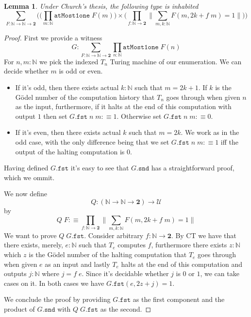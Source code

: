 \documentclass[12pt]{report}
\newtheorem{lem}[thm]{Lemma}
\begin{document}
\begin{lem}\label{405}
Under Church's thesis, the following type is inhabited
$$\sum_{F : \mathbb{N} \rightarrow \mathbb{N} \rightarrow \mathbf{2}} \Big( \big(\prod_{m : \mathbb{N}} \mathtt{atMost1one}\; F(m) \big) \times \big( \prod_{f : \mathbb{N} \rightarrow \mathbf{2}} \big\lVert \sum_{m, k : \mathbb{N}} F(m, 2k+ f\; m) = 1 \big\rVert \big) \Big)$$
\end{lem}
\begin{proof}
First we provide a witness
$$G : \sum_{F : \mathbb{N} \rightarrow \mathbb{N} \rightarrow \mathbf{2} } \prod_{n : \mathbb{N}}\mathtt{atMost1one}\; F(n)$$
For $n, m : \mathbb{N}$ we pick the indexed $T_n$ Turing machine of our enumeration. 
We can decide whether $m$ is odd or even. 
\begin{itemize}
\item If it's odd, then there exists actual $k : \mathbb{N}$ such that $m = 2k +1$. 
If $k$ is the Gödel number of the computation history that $T_n$ goes through when given $n$ as the input, furthermore, if it halts at the end of this computation with output $1$ then set $G.\mathtt{fst}\; n\; m :\equiv 1$. 
Otherwise set $G.\mathtt{fst}\; n\; m :\equiv 0$.
\item If it's even, then there exists actual $k$ such that $m = 2k$. 
We work as in the odd case, with the only difference being that we set $G.\mathtt{fst}\; n\; m :\equiv 1$ iff the output of the halting computation is $0$.
\end{itemize}
Having defined $G.\mathtt{fst}$ it's easy to see that $G.\mathtt{snd}$ has a straightforward proof, which we ommit. 

We now define 
$$Q : (\mathbb{N} \rightarrow \mathbb{N} \rightarrow \mathbf{2}) \rightarrow \mathcal{U}$$ 
by 
$$Q\; F :\equiv \prod_{f : \mathbb{N} \rightarrow \mathbf{2}} \big\lVert \sum_{m, k : \mathbb{N}} F(m, 2k+ f\; m) = 1 \big\rVert$$
We want to prove $Q\; G.\mathtt{fst}$. 
Consider arbitrary $f : \mathbb{N} \rightarrow \mathbf{2}$. 
By CT we have that there exists, merely, $e : \mathbb{N}$ such that $T_e$ computes $f$, furthermore there exists $z : \mathbb{N}$ which $z$ is the Gödel number of the halting computation that $T_e$ goes through when given $e$ as an input and lastly $T_e$ halts at the end of this computation and outputs $j : \mathbb{N}$ where $j = f\; e$. 
Since it's decidable whether $j$ is $0$ or $1$, we can take cases on it.
In both cases we have $G.\mathtt{fst} (e, 2z + j) = 1$. 

We conclude the proof by providing $G.\mathtt{fst}$ as the first component and the product of $G.\mathtt{snd}$ with $Q\; G.\mathtt{fst}$ as the second.
\end{proof}
\end{document}
